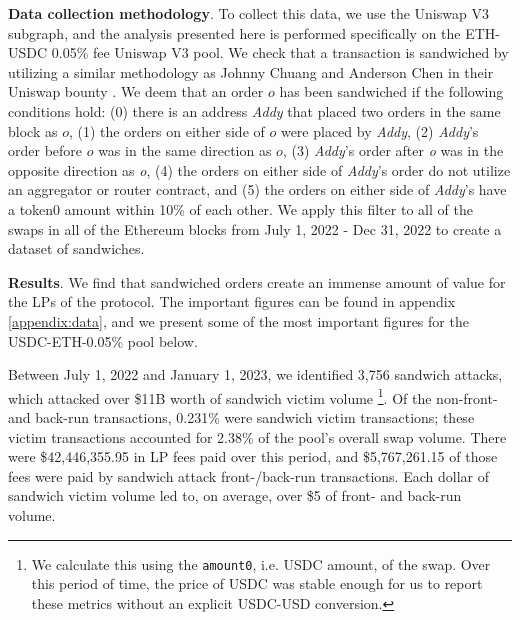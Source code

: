         \textbf{Data collection methodology}. 
        To collect this data, we use the Uniswap V3 subgraph, and the analysis presented here is performed specifically on the ETH-USDC 0.05\% fee Uniswap V3 pool. We check that a transaction is sandwiched by utilizing a similar methodology as Johnny Chuang and Anderson Chen in their Uniswap bounty 
        \cite{chuang2022mev}. 
        We deem that an order $o$ has been sandwiched if the following conditions hold: (0) there is an address \textit{Addy} that placed two orders in the same block as $o$, (1) the orders on either side of $o$ were placed by \textit{Addy}, (2) \textit{Addy}'s order before $o$ was in the same direction as $o$, (3) \textit{Addy}'s order after \textit{o} was in the opposite direction as \textit{o}, (4) the orders on either side of \textit{Addy}'s order do not utilize an aggregator or router contract, and (5) the orders on either side of \textit{Addy}'s have a token0 amount within 10\% of each other. We apply this filter to all of the swaps in all of the Ethereum blocks from July 1, 2022 - Dec 31, 2022 to create a dataset of sandwiches.

        \textbf{Results}.
        We find that sandwiched orders create an immense amount of value for the LPs of the protocol.
        The important figures can be found in appendix \ref{appendix:data}, and we present some of the most important figures for the USDC-ETH-0.05\% pool below.
        
        Between July 1, 2022 and January 1, 2023, we identified 3,756 sandwich attacks, which attacked over \$11B worth of sandwich victim volume \footnote{We calculate this using the \texttt{amount0}, i.e. USDC amount, of the swap. Over this period of time, the price of USDC was stable enough for us to report these metrics without an explicit USDC-USD conversion.}. 
        Of the non-front- and back-run transactions, 0.231\% were sandwich victim transactions; these victim transactions accounted for 2.38\% of the pool's overall swap volume.
        There were \$42,446,355.95 in LP fees paid over this period, and \$5,767,261.15 of those fees were paid by sandwich attack front-/back-run transactions. Each dollar of sandwich victim volume led to, on average, over \$5 of front- and back-run volume.

